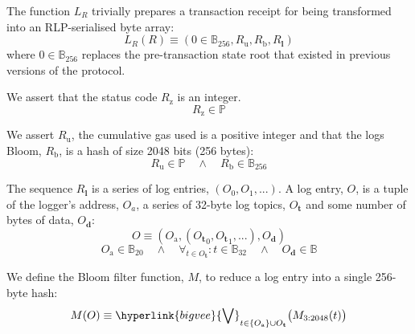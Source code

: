 \documentclass[9pt,oneside]{amsart}
\begin{document}
\begin{multicols}{2}
The function $L_{R}$ trivially prepares a transaction receipt for being transformed into an RLP-serialised byte array:
\begin{equation}
L_{R}(R) \equiv (0 \in \mathbb{B}_{256}, R_{\mathrm{u}}, R_{\mathrm{b}}, R_{\mathbf{l}})
\end{equation}
where $0 \in \mathbb{B}_{256}$ replaces the pre-transaction state root that existed in previous versions of the protocol.

We assert that the status code $R_{\mathrm{z}}$ is an integer.
\begin{equation}
R_{\mathrm{z}} \in \mathbb{P}
\end{equation}

We assert $R_{\mathrm{u}}$, the cumulative gas used is a positive integer and that the logs Bloom, $R_{\mathrm{b}}$, is a hash of size 2048 bits (256 bytes):
\begin{equation}
R_{\mathrm{u}} \in \mathbb{P} \quad \wedge \quad R_{\mathrm{b}} \in \mathbb{B}_{256}
\end{equation}


The sequence $R_{\mathbf{l}}$ is a series of log entries, $(O_0, O_1, ...)$. A log entry, $O$, is a tuple of the logger's address, $O_a$, a series of 32-byte log topics, $O_{\mathbf{t}}$ and some number of bytes of data, $O_{\mathbf{d}}$:
\begin{equation}
O \equiv (O_{\mathrm{a}}, ({O_{\mathbf{t}}}_0, {O_{\mathbf{t}}}_1, ...), O_{\mathbf{d}})
\end{equation}
\begin{equation}
O_{\mathrm{a}} \in \mathbb{B}_{20} \quad \wedge \quad \forall_{t \in O_{\mathbf{t}}}: t \in \mathbb{B}_{32} \quad \wedge \quad O_{\mathbf{d}} \in \mathbb{B}
\end{equation}

We define the Bloom filter function, $M$, to reduce a log entry into a single 256-byte hash:
\begin{equation}
M(O) \equiv \hyperlink{bigvee}{\bigvee}_{t \in \{O_{\mathrm{a}}\} \cup O_{\mathbf{t}}} \big( M_{3:2048}(t) \big)
\end{equation}


\end{multicols}
\end{document}
